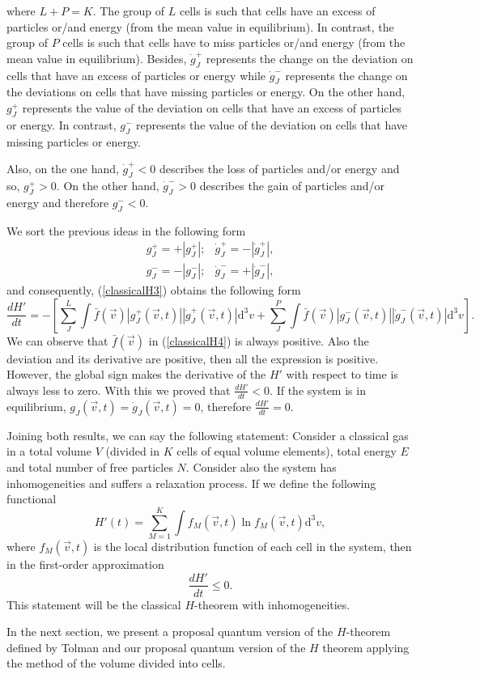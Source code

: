 %
where $L+P=K$. The group of $L$ cells is such that cells have an excess of
particles or/and energy (from the mean value in equilibrium). In contrast,
the group of $P$ cells is such that cells have to miss particles or/and energy
(from the mean value in equilibrium). Besides, $\dot{g}^{+}_{J}$ represents the
change on the deviation on cells that have an excess of particles or energy
while $\dot{g}^{-}_{J}$  represents the change on the deviations on cells that
have missing particles or energy. 
On the other hand, $g^{+}_{J}$  represents the value of the deviation on cells
that have an excess of particles or energy. In contrast, $g^{-}_{J}$ represents
the value of the deviation on cells that have missing particles or energy.

Also, on the one hand, $\dot{g}^{+}_{J}<0$ describes the loss of particles
and/or energy and so, $g^{+}_{J}>0$. On the other hand, $\dot{g}^{-}_{J}>0$
describes the gain of particles and/or energy and therefore $g^{-}_{J}<0$. 

We sort the previous ideas in the following form
%
\begin{equation}\label{separacionclassical}
\begin{array}{rl}
  g^{+}_{J}=+|g^{+}_{J}|; & \dot{g}^{+}_{J}=-|\dot{g}^{+}_{J}|,\\
  g^{-}_{J}=-|g^{-}_{J}|; & \dot{g}^{-}_{J}=+|\dot{g}^{-}_{J}|,
 \end{array}
\end{equation}
%
and consequently, (\ref{classicalH3}) obtains the following form
%
\begin{equation}
    \frac{dH'}{dt}=-\left[
      \sum_J^{L}\int\bar f(\vec{v})|g_J^{+}(\vec{v},t)|
        |\dot g_J^{+}(\vec{v},t)|\mathrm{d}^3v
      +\sum_J^{P}\int\bar f(\vec{v})|g_J^{-}(\vec{v},t)|
      |\dot g_J^{-}(\vec{v},t)|\mathrm{d}^3v 
    \right]. \label{classicalH4}
\end{equation}
%
We can observe that $\bar{f}(\vec{v})$ in (\ref{classicalH4}) is always
positive. Also the deviation and its derivative are positive, then all the
expression is positive. However, the global sign makes the derivative of the
$H'$ with respect to time is always less to zero. With this we proved that
$\frac{dH'}{dt}<0$. If the system is in equilibrium,
$g_{J}(\vec{v},t)=\dot g_J(\vec{v},t)=0$, therefore $\frac{dH'}{dt}=0$.

Joining both results, we can say the following statement:
Consider a classical gas in a total volume $V$ (divided in $K$ cells of equal
volume elements), total energy $E$ and total number of free particles $N$.
Consider also the system has inhomogeneities and suffers a relaxation process.
If we define the following functional
%
\begin{equation}\label{CH3}
   H'(t)=\sum_{M=1}^{K}\int f_M(\vec{v},t) \ln f_M(\vec{v},t)\mathrm{d}^3v,
\end{equation}
%
where $f_M(\vec{v},t)$ is the local distribution function of each cell in the
system, then in the first-order approximation
%
\begin{equation}
    \frac{dH'}{dt} \leq 0.
\end{equation}
%
This statement will be the classical $H$-theorem with inhomogeneities.

In the next section, we present a proposal quantum version of the
$H$-theorem defined by Tolman and our proposal quantum version of the $H$
theorem applying the method of the volume divided into cells.


